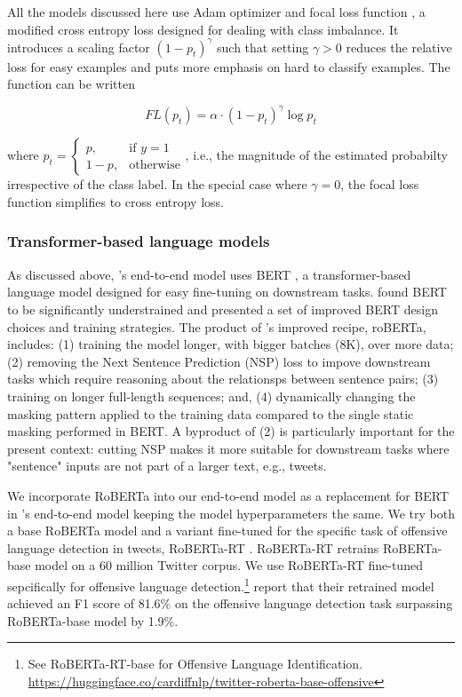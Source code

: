\documentclass[letterpaper]{article} %
\begin{document}
All the models discussed here use Adam optimizer \citep{Kingma2014} and focal loss function \citep{lin2017focal}, a modified cross entropy loss designed for dealing with class imbalance. It introduces a scaling factor $(1-p_t)^\gamma$ such that setting $\gamma > 0$ reduces the relative loss for easy examples and puts more emphasis on hard to classify examples. The function can be written

$$
FL(p_t) = \alpha \cdot (1 - p_t)^\gamma \log{p_t}
$$

where $p_t = \begin{cases} p, & \text{if } y =1 \\ 1-p, & \text{otherwise}  \end{cases}$, i.e., the magnitude of the estimated probabilty irrespective of the class label. In the special case where $\gamma=0$, the focal loss function simplifies to cross entropy loss.

\subsubsection{Transformer-based language models}

As discussed above, \citet{Miao2022}'s end-to-end model uses BERT \citep{Devlin2018}, a transformer-based language model designed for easy fine-tuning on downstream tasks\citep{Devlin2018}. \citet{Liu2019} found BERT to be significantly understrained and presented a set of improved BERT design choices and training strategies. The product of \citet{Liu2019}'s improved recipe, roBERTa, includes: (1) training the model longer, with bigger batches (8K), over more data; (2) removing the Next Sentence Prediction (NSP) loss to impove downstream tasks which require reasoning about the relationsps between sentence pairs; (3) training on longer full-length sequences; and, (4) dynamically changing the masking pattern applied to the training data compared to the single static masking performed in BERT. A byproduct of (2) is particularly important for the present context: cutting NSP makes it more suitable for downstream tasks where "sentence" inputs are not part of a larger text, e.g., tweets.

We incorporate RoBERTa into our end-to-end model as a replacement for BERT in \citet{Miao2022}'s end-to-end model keeping the model hyperparameters the same. We try both a base RoBERTa model and a variant fine-tuned for the specific task of offensive language detection in tweets, RoBERTa-RT \citep{Barbieri2020}. RoBERTa-RT retrains RoBERTa-base model on a 60 million Twitter corpus. We use RoBERTa-RT fine-tuned sepcifically for offensive language detection.\footnote{See RoBERTa-RT-base for Offensive Language Identification. \url{https://huggingface.co/cardiffnlp/twitter-roberta-base-offensive}} \citet{Barbieri2020} report that their retrained model achieved an F1 score of 81.6\% on the offensive language detection task surpassing RoBERTa-base model by 1.9\%.
\end{document}
